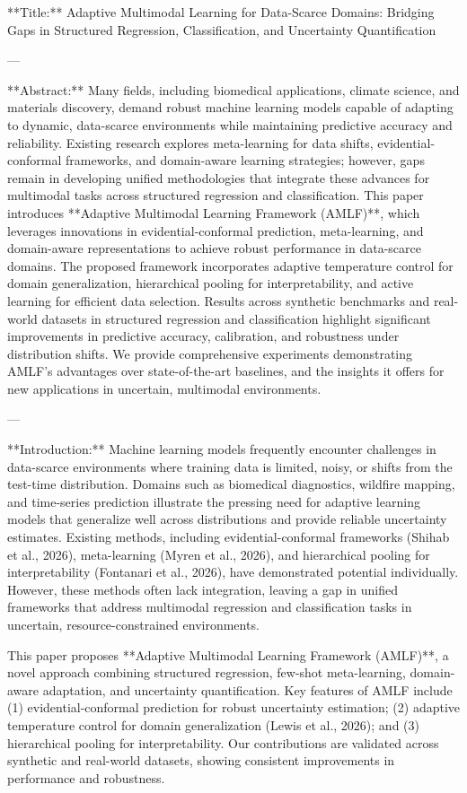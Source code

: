 **Title:** Adaptive Multimodal Learning for Data-Scarce Domains: Bridging Gaps in Structured Regression, Classification, and Uncertainty Quantification  

---

**Abstract:**  
Many fields, including biomedical applications, climate science, and materials discovery, demand robust machine learning models capable of adapting to dynamic, data-scarce environments while maintaining predictive accuracy and reliability. Existing research explores meta-learning for data shifts, evidential-conformal frameworks, and domain-aware learning strategies; however, gaps remain in developing unified methodologies that integrate these advances for multimodal tasks across structured regression and classification. This paper introduces **Adaptive Multimodal Learning Framework (AMLF)**, which leverages innovations in evidential-conformal prediction, meta-learning, and domain-aware representations to achieve robust performance in data-scarce domains. The proposed framework incorporates adaptive temperature control for domain generalization, hierarchical pooling for interpretability, and active learning for efficient data selection. Results across synthetic benchmarks and real-world datasets in structured regression and classification highlight significant improvements in predictive accuracy, calibration, and robustness under distribution shifts. We provide comprehensive experiments demonstrating AMLF’s advantages over state-of-the-art baselines, and the insights it offers for new applications in uncertain, multimodal environments.

---

**Introduction:**  
Machine learning models frequently encounter challenges in data-scarce environments where training data is limited, noisy, or shifts from the test-time distribution. Domains such as biomedical diagnostics, wildfire mapping, and time-series prediction illustrate the pressing need for adaptive learning models that generalize well across distributions and provide reliable uncertainty estimates. Existing methods, including evidential-conformal frameworks (Shihab et al., 2026), meta-learning (Myren et al., 2026), and hierarchical pooling for interpretability (Fontanari et al., 2026), have demonstrated potential individually. However, these methods often lack integration, leaving a gap in unified frameworks that address multimodal regression and classification tasks in uncertain, resource-constrained environments.

This paper proposes **Adaptive Multimodal Learning Framework (AMLF)**, a novel approach combining structured regression, few-shot meta-learning, domain-aware adaptation, and uncertainty quantification. Key features of AMLF include (1) evidential-conformal prediction for robust uncertainty estimation; (2) adaptive temperature control for domain generalization (Lewis et al., 2026); and (3) hierarchical pooling for interpretability. Our contributions are validated across synthetic and real-world datasets, showing consistent improvements in performance and robustness.

